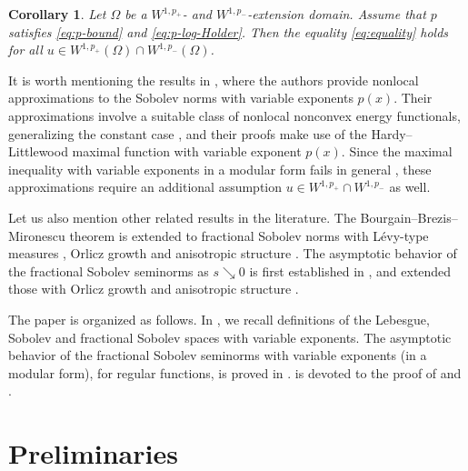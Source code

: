 \documentclass[11pt]{amsart}
\theoremstyle{plain}
\newtheorem{corollary}[theorem]{Corollary}
\theoremstyle{definition}
\numberwithin{equation}{section}
\begin{document}
\begin{corollary} \label{cor:conv}
Let $\Omega$ be a $W^{1, p_{+}}$- and $W^{1, p_{-}}$-extension domain. Assume that $p$ satisfies \eqref{eq:p-bound} and \eqref{eq:p-log-Holder}. Then the equality \eqref{eq:equality} holds for all $u \in W^{1, p_{+}}(\Omega) \cap W^{1, p_{-}}(\Omega)$.
\end{corollary}

It is worth mentioning the results in \cite{CFS21,FS22}, where the authors provide nonlocal approximations to the Sobolev norms with variable exponents $p(x)$. Their approximations involve a suitable class of nonlocal nonconvex energy functionals, generalizing the constant case \cite{BN20,Ngu06,Ngu08}, and their proofs make use of the Hardy--Littlewood maximal function with variable exponent $p(x)$. Since the maximal inequality with variable exponents in a modular form fails in general \cite{Ler05}, these approximations require an additional assumption $u \in W^{1, p_{+}} \cap W^{1, p_{-}}$ as well.

Let us also mention other related results in the literature. The Bourgain--Brezis--Mironescu theorem is extended to fractional Sobolev norms with L\'evy-type measures \cite{FG20,FGKV20}, Orlicz growth \cite{ACPS20a,FBS19} and anisotropic structure \cite{CDFB22}. The asymptotic behavior of the fractional Sobolev seminorms as $s \searrow 0$ is first established in \cite{MS02}, and extended those with Orlicz growth \cite{ACPS20b} and anisotropic structure \cite{CDFB22}.

The paper is organized as follows. In , we recall definitions of the Lebesgue, Sobolev and fractional Sobolev spaces with variable exponents. The asymptotic behavior of the fractional Sobolev seminorms with variable exponents (in a modular form), for regular functions, is proved in .  is devoted to the proof of  and .


\section{Preliminaries} \label{sec:preliminaries}

\end{document}
